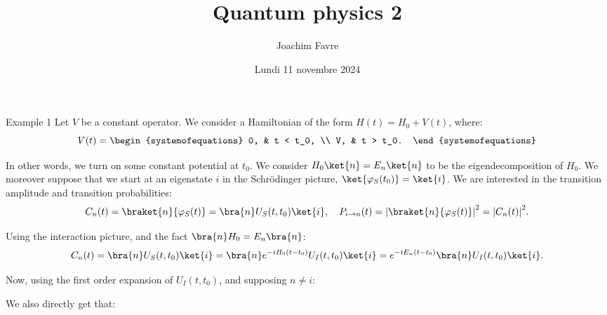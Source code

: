 \documentclass[a4paper]{article}
\title{Quantum physics 2}
\author{Joachim Favre}
\date{Lundi 11 novembre 2024}
\begin{document}
\maketitle


\begin{parag}{Example 1}
    Let $V$ be a constant operator. We consider a Hamiltonian of the form $H\left(t\right) = H_0 + V\left(t\right)$, where: 
    \[V\left(t\right) = \begin{systemofequations} 0, & t < t_0, \\ V, & t > t_0. \end{systemofequations}\]

    In other words, we turn on some constant potential at $t_0$. We consider $H_0 \ket{n} = E_n \ket{n}$ to be the eigendecomposition of $H_0$. We moreover suppose that we start at an eigenstate $i$ in the Schrödinger picture, $\ket{\phi_S\left(t_0\right)} = \ket{i}$. We are interested in the transition amplitude and transition probabilities: 
    \[C_n\left(t\right) = \braket{n}{\phi_S\left(t\right)} = \bra{n} U_S\left(t, t_0\right) \ket{i}, \mathspace P_{i \to n}\left(t\right) = \left|\braket{n}{\phi_S\left(t\right)}\right|^2 = \left|C_n\left(t\right)\right|^2.\]
    
    Using the interaction picture, and the fact $\bra{n} H_0 = E_n \bra{n}$:
    \[C_n\left(t\right) = \bra{n} U_S\left(t, t_0\right) \ket{i} = \bra{n} e^{-i H_0 \left(t- t_0\right)} U_I\left(t, t_0\right) \ket{i} = e^{-i E_n \left(t- t_0\right)} \bra{n} U_I\left(t, t_0\right) \ket{i}.\]
    
    Now, using the first order expansion of $U_I\left(t, t_0\right)$, and supposing $n \neq i$: 

    We also directly get that: 


\end{parag}
\end{document}
